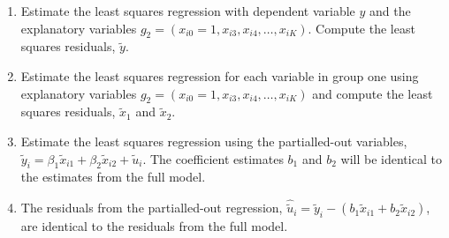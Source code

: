 \documentclass[a4paper, 10pt]{article}
\theoremstyle{definition}	%
\begin{document}
\begin{enumerate}
    \item Estimate the least squares regression with dependent variable $y$ and the explanatory variables $g_2 = (x_{i0} = 1, x_{i3}, x_{i4}, \dots, x_{iK})$. Compute the least squares residuals, $\tilde{y}$.
    \item Estimate the least squares regression for each variable in group one using explanatory variables $g_2 = (x_{i0} = 1, x_{i3}, x_{i4}, \dots, x_{iK})$ and compute the least squares residuals, $\tilde{x}_1$ and $\tilde{x}_2$.
    \item Estimate the least squares regression using the partialled-out variables, $\tilde{y}_i = \beta_1 \tilde{x}_{i1} + \beta_2 \tilde{x}_{i2} + \tilde{u}_i$. The coefficient estimates $b_1$ and $b_2$ will be identical to the estimates from the full model.
    \item The residuals from the partialled-out regression, $\hat{\tilde{u}}_i = \tilde{y}_i - (b_1 \tilde{x}_{i1} + b_2 \tilde{x}_{i2})$, are identical to the residuals from the full model.
\end{enumerate}
\end{document}
